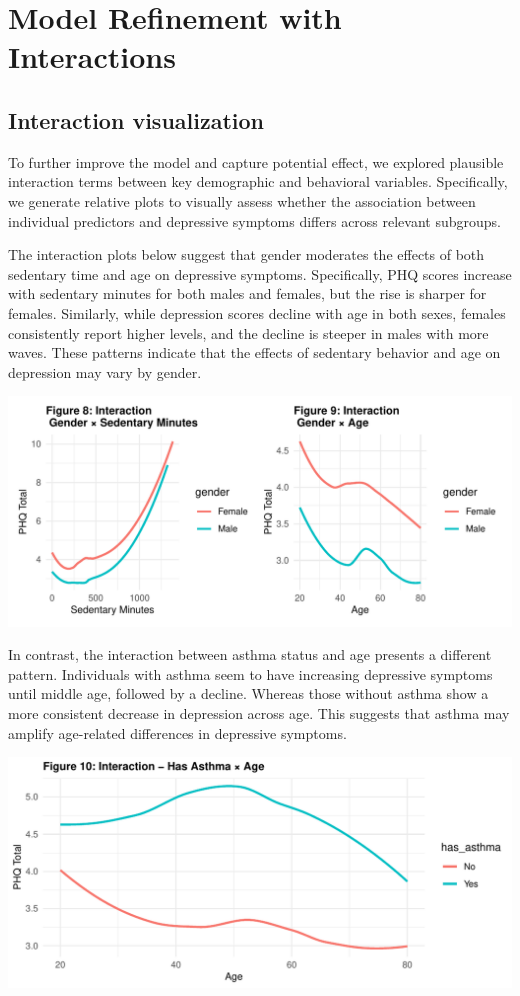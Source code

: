 \documentclass[
  11pt,
]{article}
\begin{document}
\section{Model Refinement with Interactions}\label{model-refinement-with-interactions}

\subsection{Interaction visualization}\label{interaction-visualization}

To further improve the model and capture potential effect, we explored plausible interaction terms between key demographic and behavioral variables. Specifically, we generate relative plots to visually assess whether the association between individual predictors and depressive symptoms differs across relevant subgroups.

The interaction plots below suggest that gender moderates the effects of both sedentary time and age on depressive symptoms. Specifically, PHQ scores increase with sedentary minutes for both males and females, but the rise is sharper for females. Similarly, while depression scores decline with age in both sexes, females consistently report higher levels, and the decline is steeper in males with more waves. These patterns indicate that the effects of sedentary behavior and age on depression may vary by gender.

\includegraphics{report_files/figure-latex/interaction-1.pdf}

In contrast, the interaction between asthma status and age presents a different pattern. Individuals with asthma seem to have increasing depressive symptoms until middle age, followed by a decline. Whereas those without asthma show a more consistent decrease in depression across age. This suggests that asthma may amplify age-related differences in depressive symptoms.

\includegraphics{report_files/figure-latex/interaction2-1.pdf}
\end{document}
